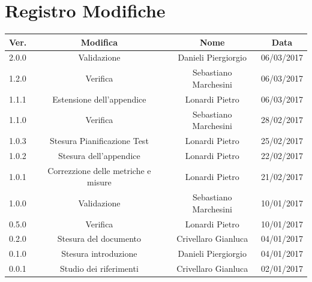 \documentclass[12pt,a4paper,titlepage]{article}
\begin{document}
	
	
	\clearpage %
	
	
	\chead{}
	\cfoot{}
	\renewcommand{\headrulewidth}{0.2pt}
	\renewcommand{\footrulewidth}{0.2pt}
	
	\section{Registro Modifiche}
	\begin{center}
	\small %
	{\renewcommand\arraystretch{1.2} %
		\begin{tabular}{|l|c|c|c|}
			\hline
			{\textbf{Ver.}}&{\textbf{Modifica}}&{\textbf{Nome}}&{\textbf{Data}}\\
			\hline 
			2.0.0 & Validazione & Danieli Piergiorgio & 06/03/2017 \\
			\hline 
			1.2.0 & Verifica & Sebastiano Marchesini & 06/03/2017 \\
			\hline 
			1.1.1 & Estensione dell'appendice & Lonardi Pietro & 06/03/2017 \\
			\hline
			1.1.0 & Verifica & Sebastiano Marchesini & 28/02/2017 \\
			\hline
			1.0.3 & Stesura Pianificazione Test & Lonardi Pietro & 25/02/2017 \\
			\hline
			1.0.2 & Stesura dell'appendice & Lonardi Pietro & 22/02/2017 \\
			\hline
			1.0.1 & Correzzione delle metriche e misure & Lonardi Pietro & 21/02/2017 \\
			\hline
			1.0.0 & Validazione & Sebastiano Marchesini & 10/01/2017 \\
			\hline
			0.5.0 & Verifica & Lonardi Pietro & 10/01/2017 \\
			\hline
			0.2.0 & Stesura del documento & Crivellaro Gianluca & 04/01/2017 \\
			\hline
			0.1.0 & Stesura introduzione & Danieli Piergiorgio & 04/01/2017 \\
			\hline
			0.0.1 & Studio dei riferimenti & Crivellaro Gianluca & 02/01/2017 \\
			\hline
		\end{tabular}
	}
	\end{center}
	\normalsize
	
\end{document}
